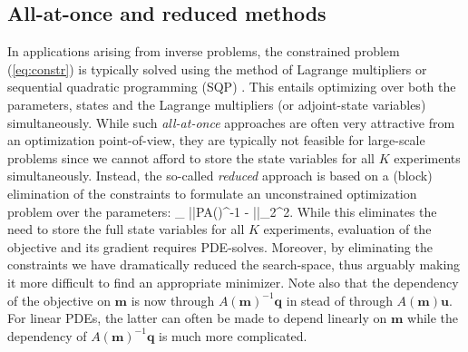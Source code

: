\documentclass{iopart}
\begin{document}
\subsection{All-at-once and reduced methods}
In applications arising from inverse problems, the constrained problem (\ref{eq:constr}) is typically solved using the method of Lagrange multipliers \cite{Haber2000,Grote2014} or sequential quadratic programming (SQP) \cite{Dennis1998,Heinkenschloss2008}. This entails optimizing over both the parameters, states and the Lagrange multipliers (or adjoint-state variables) simultaneously. While such \emph{all-at-once} approaches are often very attractive from an optimization point-of-view, they are typically not feasible for large-scale problems since we cannot afford to store the state variables for all $K$ experiments simultaneously. Instead, the so-called \emph{reduced} approach is based on a (block) elimination of the constraints to formulate an unconstrained optimization problem over the parameters:
\bq
\label{eq:red}
\min_{} ||PA()^{-1} - ||_2^2.
\eq
While this eliminates the need to store the full state variables for all $K$ experiments, evaluation of the objective and its gradient requires PDE-solves. Moreover, by eliminating the constraints we have dramatically reduced the search-space, thus arguably making it more difficult to find an appropriate minimizer. Note also that the dependency of the objective on $\mathbf{m}$ is now through $A(\mathbf{m})^{-1}\mathbf{q}$ in stead of through $A(\mathbf{m})\mathbf{u}$. For linear PDEs, the latter can often be made to depend linearly on $\mathbf{m}$ while the dependency of $A(\mathbf{m})^{-1}\mathbf{q}$ is much more complicated.
\end{document}
